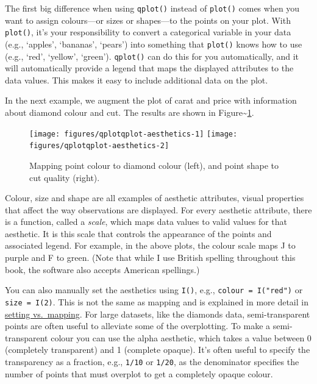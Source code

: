 The first big difference when using \texttt{qplot()} instead of
\texttt{plot()} comes when you want to assign colours---or sizes or
shapes---to the points on your plot. With \texttt{plot()}, it's your
responsibility to convert a categorical variable in your data (e.g.,
`apples', `bananas', `pears') into something that \texttt{plot()} knows
how to use (e.g., `red', `yellow', `green'). \texttt{qplot()} can do
this for you automatically, and it will automatically provide a legend
that maps the displayed attributes to the data values. This makes it
easy to include additional data on the plot.

In the next example, we augment the plot of carat and price with
information about diamond colour and cut. The results are shown in
Figure\textasciitilde{}\ref{fig:qplot-aesthetics}.

\begin{Shaded}
\begin{Highlighting}[]
  
  
\end{Highlighting}
\end{Shaded}

\begin{figure}
\texttt{[image: figures/qplotqplot-aesthetics-1]} \texttt{[image: figures/qplotqplot-aesthetics-2]} \caption{Mapping point colour to diamond colour (left), and point shape to cut quality (right).\label{fig:qplot-aesthetics}}
\end{figure}

Colour, size and shape are all examples of aesthetic attributes, visual
properties that affect the way observations are displayed. For every
aesthetic attribute, there is a function, called a \emph{scale}, which
maps data values to valid values for that aesthetic. It is this scale
that controls the appearance of the points and associated legend. For
example, in the above plots, the colour scale maps J to purple and F to
green. (Note that while I use British spelling throughout this book, the
software also accepts American spellings.)

You can also manually set the aesthetics using \texttt{I()}, e.g.,
\texttt{colour = I("red")} or \texttt{size = I(2)}. This is not the same
as mapping and is explained in more detail in
\hyperref[sub:setting-mapping]{setting vs.~mapping}. For large datasets,
like the diamonds data, semi-transparent points are often useful to
alleviate some of the overplotting. To make a semi-transparent colour
you can use the alpha aesthetic, which takes a value between 0
(completely transparent) and 1 (complete opaque). It's often useful to
specify the transparency as a fraction, e.g., \texttt{1/10} or
\texttt{1/20}, as the denominator specifies the number of points that
must overplot to get a completely opaque colour.
 

